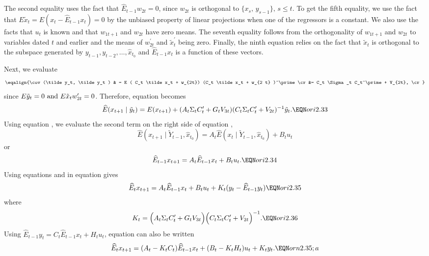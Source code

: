 The second equality uses the fact that $\widehat E_{t-1} w_{2t} = 0$, since
$w_{2t}$ is orthogonal to $\{x_s,\, y_{s-1}\},\, s \leq t$.  To get the
fifth equality, we use the fact that $E \tilde x_t = E (x_t - \widehat E_{t-1}
x_t) = 0$ by the unbiased property of linear projections when one of the
regressors is a constant.  We also use the
facts that $u_t$ is known and that $w_{1t+1}$ and $w_{2t}$ have zero means.  The
seventh equality follows from the orthogonality of $w_{1t+1}$ and $w_{2t}$ to
variables dated $t$ and earlier and the means of $w_{2t}^\prime$ and $\tilde
x_t^\prime$ being zero.  Finally, the ninth equation relies on the fact that
$\tilde x_t$ is orthogonal to the subspace generated by $y_{t-1}, y_{t-2},
\ldots, \hat x_{t_0}$ and $\widehat E_{t-1} x_t$ is a function of these vectors.

Next, we evaluate
$$\eqalign{\cov (\tilde y_t, \tilde y_t ) & = E ( C_t
\tilde x_t + w_{2t}) (C_t \tilde x_t + w_{2 t} )^\prime \cr
&= C_t \Sigma_t C_t^\prime + V_{2t}, \cr}$$
since $E \tilde y_t = 0 \hbox { and } E \tilde x_t w_{2t}^\prime = 0$.
Therefore, equation  becomes
$$\widehat E (x_{t+1} \mid \tilde y_t ) = E ( x_{t+1}) + (A_t \Sigma_t
C_t^\prime + G_t V_{3t}) (C_t \Sigma_t C_t^\prime + V_{2t})^{-1} \tilde y_t .
\EQN ori2.33$$
Using equation , we evaluate the second term on the right side
of equation ,
$$\widehat E (x_{t+1} \mid \tilde Y_{t-1}, \hat x_{t_0}) = A_t \widehat E (x_t
\mid \tilde Y_{t-1}, \hat x_{t_0}) + B_t u_t$$
or
$$\widehat E_{t-1} x_{t+1} = A_t \widehat E_{t-1} x_t+B_t u_t .\EQN ori2.34$$
Using equations  and  in equation  gives
$$\widehat E_t x_{t+1} = A_t \widehat E_{t-1} x_t + B_t u_t + K_t
(y_t - \widehat E_{t-1} y_t ) \EQN ori2.35$$
where
$$K_t = \Bigl( A_t \Sigma_t C_t^\prime + G_t V_{3 t} \Bigr)
\Bigl(C_t \Sigma_t C_t^\prime + V_{2 t}\Bigr)^{-1} .\EQN ori2.36$$
Using $\widehat E_{t-1} y_t = C_t \widehat E_{t-1} x_t + H_t u_t$,
equation  can also be written
$$\widehat E_t x_{t+1} = (A_t - K_t C_t ) \widehat E_{t-1} x_t + ( B_t - K_t
H_t ) u_t + K_t y_t .\EQN orn2.35;a$$

